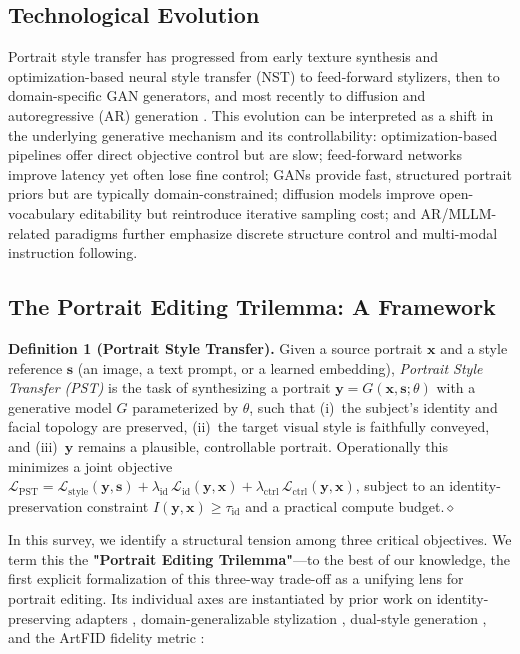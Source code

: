 \documentclass[journal]{IEEEtran}
\begin{document}
\subsection{Technological Evolution}
\label{sec:intro:evolution}
Portrait style transfer has progressed from early texture synthesis and optimization-based neural style transfer (NST) to feed-forward stylizers, then to domain-specific GAN generators, and most recently to diffusion and autoregressive (AR) generation \cite{gatys2015ana,gatys2016image,johnson2016perceptual,ulyanov2016texture,huang2017arbitraryst,goodfellow2014generative,karras2018progressive,karras2020training,ho2020denoising,rombach_2022_cvpr}. This evolution can be interpreted as a shift in the underlying generative mechanism and its controllability: optimization-based pipelines offer direct objective control but are slow; feed-forward networks improve latency yet often lose fine control; GANs provide fast, structured portrait priors but are typically domain-constrained; diffusion models improve open-vocabulary editability but reintroduce iterative sampling cost; and AR/MLLM-related paradigms further emphasize discrete structure control and multi-modal instruction following.

\subsection{The Portrait Editing Trilemma: A Framework}
\label{sec:intro:trilemma}

\noindent\textbf{Definition 1 (Portrait Style Transfer).} Given a source portrait $\mathbf{x}$ and a style reference $\mathbf{s}$ (an image, a text prompt, or a learned embedding), \emph{Portrait Style Transfer (PST)} is the task of synthesizing a portrait $\mathbf{y} = G(\mathbf{x}, \mathbf{s}; \theta)$ with a generative model $G$ parameterized by $\theta$, such that (i)~the subject's identity and facial topology are preserved, (ii)~the target visual style is faithfully conveyed, and (iii)~$\mathbf{y}$ remains a plausible, controllable portrait. Operationally this minimizes a joint objective
$\mathcal{L}_{\mathrm{PST}} = \mathcal{L}_{\mathrm{style}}(\mathbf{y},\mathbf{s}) + \lambda_{\mathrm{id}}\,\mathcal{L}_{\mathrm{id}}(\mathbf{y},\mathbf{x}) + \lambda_{\mathrm{ctrl}}\,\mathcal{L}_{\mathrm{ctrl}}(\mathbf{y},\mathbf{x})$,
subject to an identity-preservation constraint $I(\mathbf{y},\mathbf{x})\ge \tau_{\mathrm{id}}$ and a practical compute budget.\hfill$\diamond$

In this survey, we identify a structural tension among three critical objectives. We term this the \textbf{"Portrait Editing Trilemma"}---to the best of our knowledge, the first explicit formalization of this three-way trade-off as a unifying lens for portrait editing. Its individual axes are instantiated by prior work on identity-preserving adapters \cite{wang2024instantstyle}, domain-generalizable stylization \cite{wang2025domaingp}, dual-style generation \cite{yang_2022_cvpr}, and the ArtFID fidelity metric \cite{wright2022artfidqe}:
\end{document}
